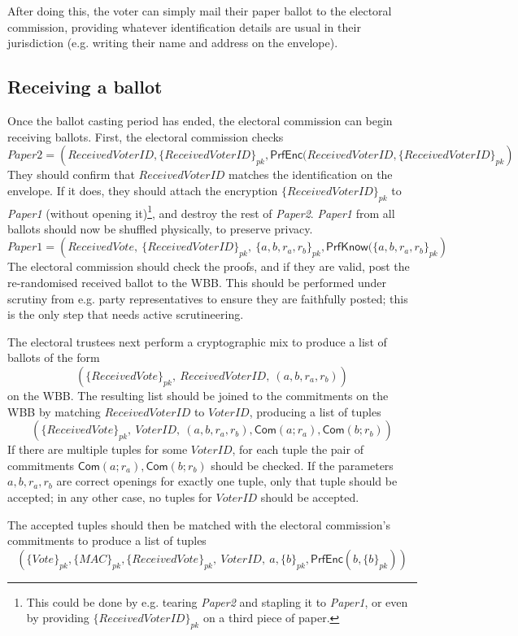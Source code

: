 \documentclass[11pt,twoside,a4paper]{article}
\newcommand{\commit}{\mathsf{Com}}
\newcommand{\PrfEnc}{\mathsf{PrfEnc}}
\newcommand{\PrfKnow}{\mathsf{PrfKnow}}
\theoremstyle{definition}
\begin{document}
After doing this, the voter can simply mail their paper ballot to the electoral commission, providing whatever identification details are usual in their jurisdiction (e.g. writing their name and address on the envelope).
\subsection{Receiving a ballot}
Once the ballot casting period has ended, the electoral commission can begin receiving ballots. First, the electoral commission checks
\[\textit{Paper2}=\left(ReceivedVoterID, \{ReceivedVoterID\}_{pk},\PrfEnc(ReceivedVoterID, \{ReceivedVoterID\}_{pk}\right)\]
They should confirm that \(ReceivedVoterID\) matches the identification on the envelope. If it does, they should attach the encryption \(\{ReceivedVoterID\}_{pk}\) to \textit{Paper1} (without opening it)\footnote{This could be done by e.g. tearing \textit{Paper2} and stapling it to \textit{Paper1}, or even by providing \(\{ReceivedVoterID\}_{pk}\) on a third piece of paper.}, and destroy the rest of \textit{Paper2}. \textit{Paper1} from all ballots should now be shuffled physically, to preserve privacy.
\[\textit{Paper1}=\left(ReceivedVote,\ \{ReceivedVoterID\}_{pk},\ \{a,b,r_a,r_b\}_{pk}, \PrfKnow(\{a,b,r_a,r_b\}_{pk}\right)\]
The electoral commission should check the proofs, and if they are valid, post the re-randomised received ballot to the WBB. This should be performed under scrutiny from e.g. party representatives to ensure they are faithfully posted; this is the only step that needs active scrutineering.

The electoral trustees next perform a cryptographic mix to produce a list of ballots of the form
\[\left(\{ReceivedVote\}_{pk},\ ReceivedVoterID,\ (a,b,r_a,r_b)\right)\]
on the WBB. The resulting list should be joined to the commitments on the WBB by matching \(ReceivedVoterID\) to \(VoterID\), producing a list of tuples
\[\left(\{ReceivedVote\}_{pk},\ VoterID,\ (a,b,r_a,r_b), \commit(a;r_a), \commit(b;r_b)\right)\]
If there are multiple tuples for some \(VoterID\), for each tuple the pair of commitments \(\commit(a;r_a), \commit(b;r_b)\) should be checked. If the parameters \(a,b,r_a,r_b\) are correct openings for exactly one tuple, only that tuple should be accepted; in any other case, no tuples for \(VoterID\) should be accepted.

The accepted tuples should then be matched with the electoral commission's commitments to produce a list of tuples
\[\left(\{Vote\}_{pk},\{MAC\}_{pk}, \{ReceivedVote\}_{pk},\ VoterID,\ a, \{b\}_{pk}, \PrfEnc(b, \{b\}_{pk})\right)\]
\end{document}
